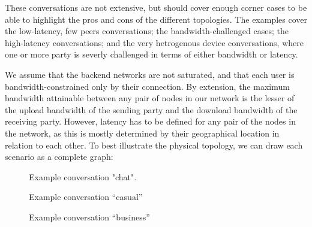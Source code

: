 These conversations are not extensive, but should cover enough corner cases to be able to highlight the pros and cons of the different topologies. The examples cover the low-latency, few peers conversations; the bandwidth-challenged cases; the high-latency conversations; and the very hetrogenous device conversations, where one or more party is severly challenged in terms of either bandwidth or latency.

We assume that the backend networks are not saturated, and that each user is bandwidth-constrained only by their connection. By extension, the maximum bandwidth attainable between any pair of nodes in our network is the lesser of the upload bandwidth of the sending party and the download bandwidth of the receiving party. However, latency has to be defined for any pair of the nodes in the network, as this is mostly determined by their geographical location in relation to each other. To best illustrate the physical topology, we can draw each scenario as a complete graph:

\begin{figure}[ht!]
\centering
    \caption{Example conversation "chat".}\label{fig:example-conv-chat}
\end{figure}

\begin{figure}[ht!]
\centering
    \caption{Example conversation ``casual''}\label{fig:example-conv-casual}
\end{figure}

\begin{figure}[ht!]
\centering
    \caption{Example conversation ``business''}\label{fig:example-conv-business}
\end{figure}


